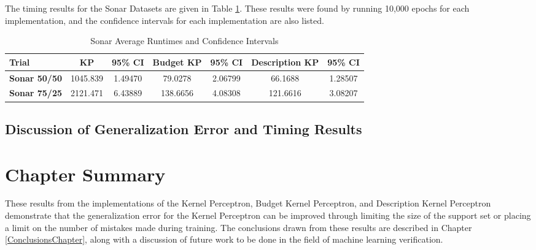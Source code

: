 The timing results for the Sonar Datasets are given in Table \ref{tab:sonartabtiming}. These results were found by running 10,000 epochs for each implementation, and the confidence intervals for each implementation are also listed.

\begin{table}[ht]
 \begin{center}
  \caption{Sonar Average Runtimes and Confidence Intervals}
  \label{tab:sonartabtiming}
  \begin{tabular}{l|c|c|c|c|c|c}
  \textbf{Trial} & \textbf{KP} & \textbf{95\% CI} & \textbf{Budget KP} & \textbf{95\% CI} & \textbf{Description KP} & \textbf{95\% CI}\\
  \hline
  \textbf{Sonar 50/50} & 1045.839 & 1.49470 & 79.0278 & 2.06799 & 66.1688 & 1.28507\\
  \textbf{Sonar 75/25} & 2121.471 & 6.43889 & 138.6656 & 4.08308 & 121.6616 & 3.08207\\
  \end{tabular}
 \end{center}
\end{table}

\subsection{Discussion of Generalization Error and Timing Results}\label{ResultsDiscussion}
\section{Chapter Summary}\label{ResultsChapterSummarySection}
These results from the implementations of the Kernel Perceptron, Budget Kernel Perceptron, and Description Kernel Perceptron demonstrate that the generalization error for the Kernel Perceptron can be improved through limiting the size of the support set or placing a limit on the number of mistakes made during training. The conclusions drawn from these results are described in Chapter \ref{ConclusionsChapter}, along with a discussion of future work to be done in the field of machine learning verification.
